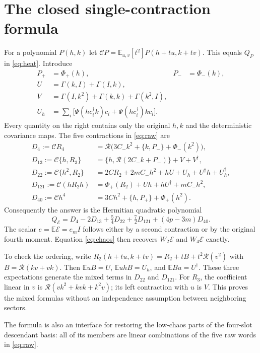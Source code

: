 \documentclass[11pt,a4paper]{article}
\newcommand{\EE}{\mathbb E}
\newcommand{\cc}{\mathcal C}
\newcommand{\rr}{\mathcal R}
\newcommand{\core}{\mathcal E}
\begin{document}
\newpage
\section{The closed single-contraction formula}
For a polynomial $P(h,k)$ let
$\cc P=\EE_{u,v}[t^2]P(h+tu,k+tv)$. This equals $Q_P$ in
\eqref{eq:heat}. Introduce
\begin{align}
 P_+&=\Phi_+(h),&P_-&=\Phi_-(k),\\
 U&=\Gamma(k,I)+\Gamma(I,k),\\
 V&=\Gamma(I,k^2)+\Gamma(k,k)+\Gamma(k^2,I),\\
 U_h&=\sum_i\big[\Psi(hc_i^\dagger k)c_i
                         +\Psi(hc_i^\dagger)kc_i\big].
\end{align}
Every quantity on the right contains only the original $h,k$ and
the deterministic covariance maps. The five contractions in
\eqref{eq:raw} are
\begin{align}
 D_4:=\cc R_4
   &=\rr\big(3C_-k^2+\{k,P_-\}+\Phi_-(k^2)\big),\\
 D_{13}:=\cc\{h,R_3\}
   &=\{h,\rr(2C_-k+P_-)\}+V+V^\dagger,\\
 D_{22}:=\cc\{h^2,R_2\}
   &=2CR_2+2mC_-h^2+hU+U_h+U^\dagger h+U_h^\dagger,\\
 D_{121}:=\cc(hR_2h)
   &=\Phi_+(R_2)+Uh+hU^\dagger+mC_-h^2,\\
 D_{40}:=\cc h^4
   &=3Ch^2+\{h,P_+\}+\Phi_+(h^2).
\end{align}
Consequently the answer is the Hermitian quadratic polynomial
\begin{equation}
 \boxed{Q_{\core}=D_4-2D_{13}+\tfrac54D_{22}
                  +\tfrac72D_{121}+(4p-3m)D_{40}.}
 \label{eq:answer}
\end{equation}
The scalar $e=\EE\core=e_mI$ follows either by a second contraction
or by the original fourth moment. Equation \eqref{eq:chaos} then
recovers $W_2\core$ and $W_4\core$ exactly.

To check the ordering, write
$R_2(h+tu,k+tv)=R_2+tB+t^2\rr(v^2)$ with
$B=\rr(kv+vk)$. Then $\EE uB=U$,
$\EE uhB=U_h$, and $\EE Bu=U^\dagger$. These three expectations
generate the mixed terms in $D_{22}$ and $D_{121}$. For $R_3$, the
coefficient linear in $v$ is $\rr(vk^2+kvk+k^2v)$;
its left contraction with $u$ is $V$. This proves the mixed
formulas without an independence assumption between neighboring sectors.

The formula is also an interface for restoring the low-chaos
parts of the four-slot descendant basis: all of its members are
linear combinations of the five raw words in \eqref{eq:raw}.
\end{document}
